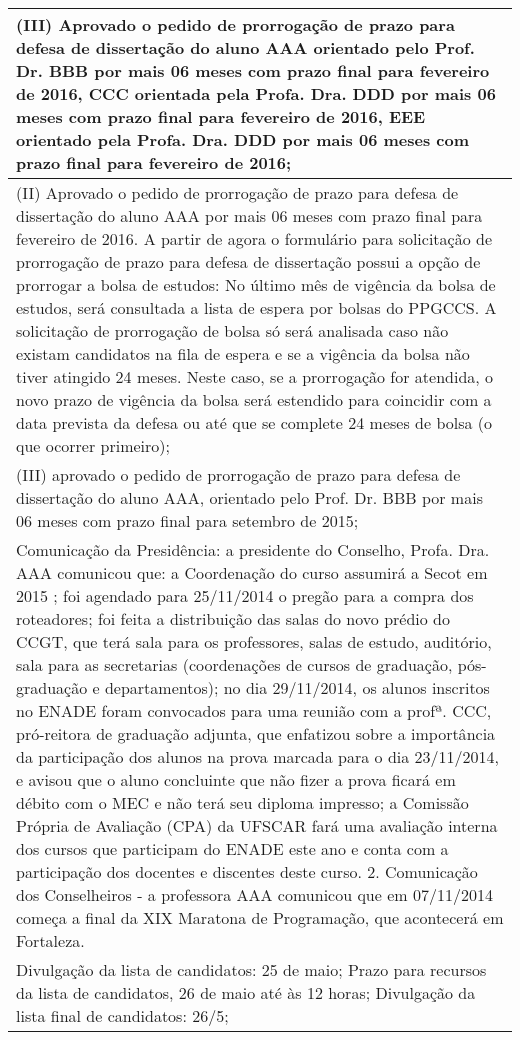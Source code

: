 
\begin{longtable}{|p{17.5cm}|}
\hline 
(III) Aprovado o pedido de prorrogação de prazo para defesa de dissertação do aluno AAA orientado pelo Prof. Dr. BBB por mais 06 meses com prazo final para fevereiro de 2016, CCC orientada pela Profa. Dra. DDD por mais 06 meses com prazo final para fevereiro de 2016, EEE orientado pela Profa. Dra. DDD por mais 06 meses com prazo final para fevereiro de 2016;

 \\ \hline 
(II) Aprovado o pedido de prorrogação de prazo para defesa de dissertação do aluno AAA por mais 06 meses com prazo final para fevereiro de 2016. A partir de agora o formulário para solicitação de prorrogação de prazo para defesa de dissertação possui a opção de prorrogar a bolsa de estudos: No último mês de vigência da bolsa de estudos, será consultada a lista de espera por bolsas do PPGCCS. A solicitação de prorrogação de bolsa só será analisada caso não existam candidatos na fila de espera e se a vigência da bolsa não tiver atingido 24 meses. Neste caso, se a prorrogação for atendida, o novo prazo de vigência da bolsa será estendido para coincidir com a data prevista da defesa ou até que se complete 24 meses de bolsa (o que ocorrer primeiro);

 \\ \hline 
(III) aprovado o pedido de prorrogação de prazo para defesa de dissertação do aluno AAA, orientado pelo Prof. Dr. BBB por mais 06 meses com prazo final para setembro de 2015;

 \\ \hline 
Comunicação da Presidência: a presidente do Conselho, Profa. Dra. AAA comunicou que: a Coordenação do curso assumirá a Secot em 2015 ; foi agendado para 25/11/2014 o pregão para a compra dos roteadores; foi feita a distribuição das salas do novo prédio do CCGT, que terá sala para os professores, salas de estudo, auditório, sala para as secretarias (coordenações de cursos de graduação, pós-graduação e departamentos); no dia 29/11/2014, os alunos inscritos no ENADE foram convocados para uma reunião com a profª. CCC, pró-reitora de graduação adjunta, que enfatizou sobre a importância da participação dos alunos na prova marcada para o dia 23/11/2014, e avisou que o aluno concluinte que não fizer a prova ficará em débito com o MEC e não terá seu diploma impresso; a Comissão Própria de Avaliação (CPA) da UFSCAR fará uma avaliação interna dos cursos que participam do ENADE este ano e conta com a participação dos docentes e discentes deste curso. 2. Comunicação dos Conselheiros - a professora AAA comunicou que em 07/11/2014 começa a final da XIX Maratona de Programação, que acontecerá em Fortaleza.

 \\ \hline 
Divulgação da lista de candidatos: 25 de maio; Prazo para recursos da lista de candidatos, 26 de maio até às 12 horas; Divulgação da lista final de candidatos: 26/5;

 \\ \hline 

\end{longtable} 




